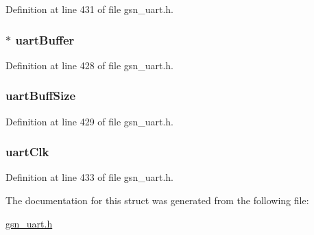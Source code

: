 Definition at line 431 of file gsn\_\-uart.h.

\hypertarget{a00268_abf2bee2b895436869a2c195cd903b51c}{
\subsubsection[{uartBuffer}]{$\ast$ {\bf uartBuffer}}}
\label{a00268_abf2bee2b895436869a2c195cd903b51c}


Definition at line 428 of file gsn\_\-uart.h.

\hypertarget{a00268_a7b40e36ac25003b4d00941ab3f8a263a}{
\subsubsection[{uartBuffSize}]{ {\bf uartBuffSize}}}
\label{a00268_a7b40e36ac25003b4d00941ab3f8a263a}


Definition at line 429 of file gsn\_\-uart.h.

\hypertarget{a00268_a42490982adbb99ac6d116705b7d36408}{
\subsubsection[{uartClk}]{ {\bf uartClk}}}
\label{a00268_a42490982adbb99ac6d116705b7d36408}


Definition at line 433 of file gsn\_\-uart.h.



The documentation for this struct was generated from the following file:\begin{DoxyCompactItemize}
\item 
\hyperlink{a00600}{gsn\_\-uart.h}\end{DoxyCompactItemize}
